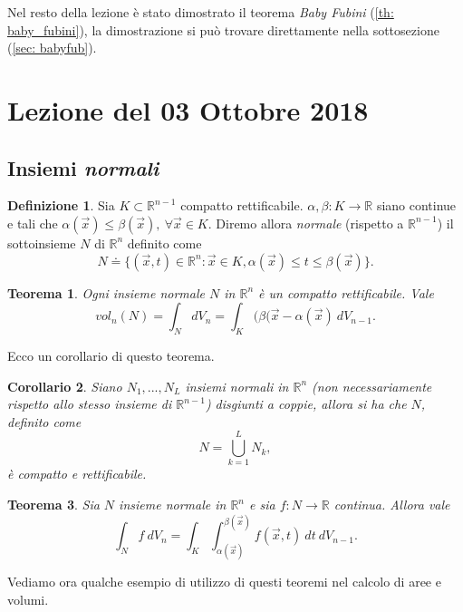 \documentclass[10pt]{article}
\theoremstyle{plain}
\newtheorem{thm}{Teorema}[section]
\newtheorem{cor}[thm]{Corollario}
\theoremstyle{definition}
\newtheorem{defn}{Definizione}
\begin{document}
\bigskip
Nel resto della lezione è stato dimostrato il teorema \textit{Baby Fubini} (\ref{th: baby_fubini}), la dimostrazione si può trovare direttamente nella sottosezione (\ref{sec: babyfub}).


\section{Lezione del 03 Ottobre 2018}

\subsection{Insiemi \textit{normali}}
\begin{defn}
Sia $K\subset \mathbb{R}^{n-1}$ compatto rettificabile. $\alpha , \beta:K\to \mathbb{R}$ siano continue e tali che $\alpha(\vec{x})\leq \beta(\vec{x}),\ \forall \vec{x} \in K$. Diremo allora \textit{normale} (rispetto a $\mathbb{R}^{n-1}$) il sottoinsieme $N$ di $\mathbb{R}^n$ definito come
$$N\doteq \{ (\vec{x},t)\in \mathbb{R}^n: \vec{x} \in K, \alpha(\vec{x})\leq t \leq \beta(\vec{x}) \}. $$
\end{defn}

\begin{thm}
Ogni insieme normale $N$ in $\mathbb{R}^n$ è un compatto rettificabile. Vale
$$vol_n(N) = \int_N dV_n = \int_K (\beta(\vec{x}-\alpha(\vec{x})\ dV_{n-1}.$$
\end{thm}

Ecco un corollario di questo teorema.
\begin{cor}
Siano $N_1,...,N_L$ insiemi normali in $\mathbb{R}^n$ (non necessariamente rispetto allo stesso insieme di $\mathbb{R}^{n-1}$) disgiunti a coppie, allora si ha che $N$, definito come
$$N=\bigcup_{k=1}^L N_k, $$ è compatto e rettificabile.
\end{cor}

\begin{thm}
Sia $N$ insieme normale in $\mathbb{R}^n$ e sia $f:N\to \mathbb{R}$ continua. Allora vale 
$$\int_N f\ dV_n = \int_K \int_{\alpha(\vec{x})}^{\beta(\vec{x})} f(\vec{x}, t)\ dt\ dV_{n-1} .$$
\end{thm}
Vediamo ora qualche esempio di utilizzo di questi teoremi nel calcolo di aree e volumi.
\end{document}
